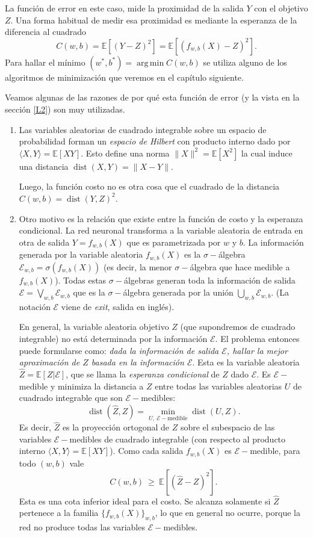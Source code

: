 \documentclass[12pt, a4paper]{amsbook}
\def\argmin{\operatorname {\mathrm{arg\, min}}}
\def\dist{\operatorname {\mathrm{dist}}}
\newcommand{\E}{{\mathbb E}}
\theoremstyle{remark}
\theoremstyle{definition}
\numberwithin{section}{chapter}
\numberwithin{subsection}{section}
\numberwithin{equation}{section}
\numberwithin{figure}{chapter}
\begin{document}
La función de error en este caso, mide la proximidad de la salida $Y$ con el objetivo $Z$. Una forma habitual de medir esa proximidad es mediante la esperanza de la diferencia al cuadrado
$$
C(w, b) = \E[(Y-Z)^2] = \E[(f_{w, b}(X)-Z)^2].
$$
Para hallar el mínimo $(w^*, b^*) = \argmin C(w, b)$ se utiliza alguno de los algoritmos de minimización que veremos en el capítulo siguiente.

Veamos algunas de las razones de por qué esta función de error (y la vista en la sección \ref{L2}) son muy utilizadas.
\begin{enumerate}
\item Las variables aleatorias de cuadrado integrable sobre un espacio de probabilidad forman un {\em espacio de Hilbert} con producto interno dado por $\langle X, Y\rangle = \E[XY]$. Esto define una norma $\|X\|^2 = \E[X^2]$ la cual induce una distancia $\dist(X, Y) = \|X-Y\|$.

Luego, la función costo no es otra cosa que el cuadrado de la distancia $C(w, b) = \dist(Y, Z)^2$.

\item Otro motivo es la relación que existe entre la función de costo y la esperanza condicional. La red neuronal transforma a la variable aleatoria de entrada en otra de salida $Y=f_{w, b}(X)$ que es parametrizada por $w$ y $b$. La información generada por la variable aleatoria $f_{w, b}(X)$ es la $\sigma-$álgebra ${\mathcal E}_{w, b} = \sigma(f_{w, b}(X))$ (es decir, la menor $\sigma-$álgebra que hace medible a $f_{w, b}(X)$). Todas estas $\sigma-$álgebras generan toda la información de salida ${\mathcal E} = \bigvee_{w, b} {\mathcal E}_{w, b}$ que es la $\sigma-$álgebra generada por la unión $\bigcup_{w, b} {\mathcal E}_{w, b}$. (La notación ${\mathcal E}$ viene de {\em exit}, salida en inglés).

En general, la variable aleatoria objetivo $Z$ (que supondremos de cuadrado integrable) no está determinada por la información $\mathcal E$. El problema entonces puede formularse como: {\em dada la información de salida $\mathcal E$, hallar la mejor aproximación de $Z$ basada en la información $\mathcal E$}. Esta es la variable aleatoria $\hat Z=\E[Z|{\mathcal E}]$, que se llama la {\em esperanza condicional} de $Z$ dado $\mathcal E$. Es $\mathcal E-$medible y minimiza la distancia a $Z$ entre todas las variables aleatorias $U$ de cuadrado integrable que son $\mathcal E-$medibles:
$$
\dist(\hat Z, Z) = \min_{U,\ {\mathcal E}-\text{medible}} \dist(U,Z).
$$
Es decir, $\hat Z$ es la proyección ortogonal de $Z$ sobre el subespacio de las variables $\mathcal E-$medibles de cuadrado integrable (con respecto al producto interno $\langle X, Y\rangle = \E[XY]$). Como cada salida $f_{w,b}(X)$ es $\mathcal E-$medible, para todo $(w,b)$ vale
$$
C(w,b)\ \ge\ \E[(\hat Z-Z)^2].
$$
Esta es una cota inferior ideal para el costo. Se alcanza solamente si $\hat Z$ pertenece a la familia $\{f_{w,b}(X)\}_{w,b}$, lo que en general no ocurre, porque la red no produce todas las variables $\mathcal E-$medibles.


\end{enumerate}
\end{document}
